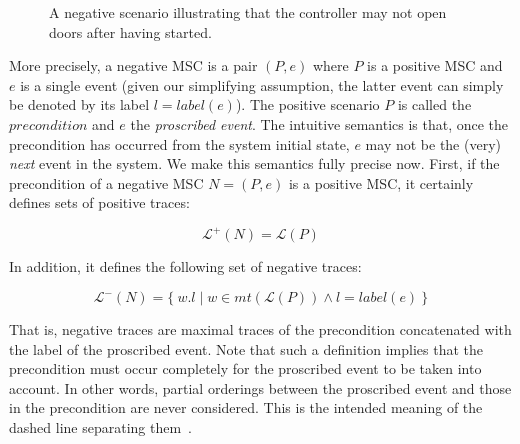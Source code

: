 \begin{figure}\centering
{}
\caption{A negative scenario illustrating that the controller may not open doors after having started.\label{image:train-negative-scenario}}
\end{figure}

More precisely, a negative MSC is a pair $(P,e)$ where $P$ is a positive MSC and $e$ is a single event (given our simplifying assumption, the latter event can simply be denoted by its label $l = label(e)$). The positive scenario $P$ is called the $precondition$ and $e$ the \emph{proscribed event}. The intuitive semantics is that, once the precondition has occurred from the system initial state, $e$ may not be the (very) \emph{next} event in the system. We make this semantics fully precise now. First, if the precondition of a negative MSC $N = (P,e)$ is a positive MSC, it certainly defines sets of positive traces:

\vspace{-0.2cm}
\begin{equation*}
\mathcal{L}^{+}(N) = \mathcal{L}(P)
\end{equation*}

\noindent In addition, it defines the following set of negative traces:

\vspace{-0.2cm}
\begin{equation*}
\mathcal{L}^{-}(N) = \{~w.l \mid w \in mt(\mathcal{L}(P)) \wedge l = label(e)~\}
\end{equation*}

That is, negative traces are maximal traces of the precondition concatenated with the label of the proscribed event. Note that such a definition implies that the precondition must occur completely for the proscribed event to be taken into account. In other words, partial orderings between the proscribed event and those in the precondition are never considered. This is the intended meaning of the dashed line separating them~\cite{Uchitel:2004}. 

